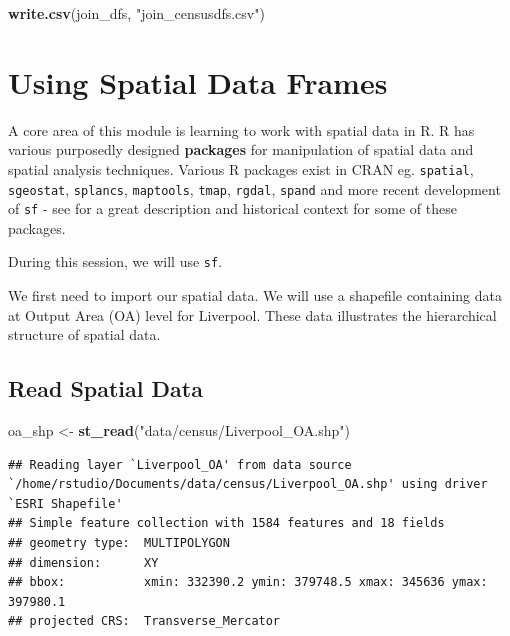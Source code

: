 \documentclass[
]{book}
\newenvironment{Shaded}{\begin{snugshade}}{\end{snugshade}}
\newcommand{\KeywordTok}[1]{\textcolor[rgb]{0.13,0.29,0.53}{\textbf{#1}}}
\newcommand{\NormalTok}[1]{#1}
\newcommand{\StringTok}[1]{\textcolor[rgb]{0.31,0.60,0.02}{#1}}
\begin{document}
\begin{Shaded}
\begin{Highlighting}[]
\KeywordTok{write.csv}\NormalTok{(join_dfs, }\StringTok{"join_censusdfs.csv"}\NormalTok{)}
\end{Highlighting}
\end{Shaded}

\hypertarget{using-spatial-data-frames}{%
\section{Using Spatial Data Frames}\label{using-spatial-data-frames}}

A core area of this module is learning to work with spatial data in R. R has various purposedly designed \textbf{packages} for manipulation of spatial data and spatial analysis techniques. Various R packages exist in CRAN eg. \texttt{spatial}, \texttt{sgeostat}, \texttt{splancs}, \texttt{maptools}, \texttt{tmap}, \texttt{rgdal}, \texttt{spand} and more recent development of \texttt{sf} - see \citet{Lovelace_et_al_2020_book} for a great description and historical context for some of these packages.

During this session, we will use \texttt{sf}.

We first need to import our spatial data. We will use a shapefile containing data at Output Area (OA) level for Liverpool. These data illustrates the hierarchical structure of spatial data.

\hypertarget{read-spatial-data}{%
\subsection{Read Spatial Data}\label{read-spatial-data}}

\begin{Shaded}
\begin{Highlighting}[]
\NormalTok{oa_shp <-}\StringTok{ }\KeywordTok{st_read}\NormalTok{(}\StringTok{"data/census/Liverpool_OA.shp"}\NormalTok{)}
\end{Highlighting}
\end{Shaded}

\begin{verbatim}
## Reading layer `Liverpool_OA' from data source `/home/rstudio/Documents/data/census/Liverpool_OA.shp' using driver `ESRI Shapefile'
## Simple feature collection with 1584 features and 18 fields
## geometry type:  MULTIPOLYGON
## dimension:      XY
## bbox:           xmin: 332390.2 ymin: 379748.5 xmax: 345636 ymax: 397980.1
## projected CRS:  Transverse_Mercator
\end{verbatim}
\end{document}
